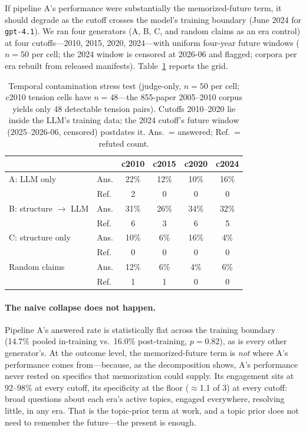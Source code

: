 If pipeline A's performance were substantially the memorized-future
term, it should degrade as the cutoff crosses the model's training
boundary (June 2024 for \texttt{gpt-4.1}). We ran four generators (A,
B, C, and random claims as an era control) at four cutoffs---2010,
2015, 2020, 2024---with uniform four-year future windows ($n=50$ per
cell; the 2024 window is censored at 2026-06 and flagged; corpora per
era rebuilt from released manifests). Table~\ref{tab:stress} reports
the grid.

\begin{table}[t]
  \centering
  \small
  \caption{Temporal contamination stress test (judge-only, $n=50$ per
  cell; c2010 tension cells have $n=48$---the 855-paper 2005--2010
  corpus yields only 48 detectable tension pairs). Cutoffs 2010--2020
  lie inside the LLM's training data; the 2024 cutoff's future window
  (2025--2026-06, censored) postdates it. Ans.\ = answered; Ref.\ =
  refuted count.}
  \label{tab:stress}
  \begin{tabular}{@{}llcccc@{}}
    \toprule
    & & c2010 & c2015 & c2020 & c2024 \\
    \midrule
    A: LLM only & Ans. & 22\% & 12\% & 10\% & 16\% \\
                & Ref. & 2 & 0 & 0 & 0 \\
    B: structure $\to$ LLM & Ans. & 31\% & 26\% & 34\% & 32\% \\
                & Ref. & 6 & 3 & 6 & 5 \\
    C: structure only & Ans. & 10\% & 6\% & 16\% & 4\% \\
                & Ref. & 0 & 0 & 0 & 0 \\
    Random claims & Ans. & 12\% & 6\% & 4\% & 6\% \\
                & Ref. & 1 & 1 & 0 & 0 \\
    \bottomrule
  \end{tabular}
\end{table}

\paragraph{The naive collapse does not happen.} Pipeline A's answered
rate is statistically flat across the training boundary (14.7\% pooled
in-training vs.\ 16.0\% post-training, $p=0.82$), as is every other
generator's. At the outcome level, the memorized-future term is
\emph{not} where A's performance comes from---because, as the
decomposition shows, A's performance never rested on specifics that
memorization could supply. Its engagement sits at 92--98\% at every
cutoff, its specificity at the floor ($\approx$1.1 of 3) at every
cutoff: broad questions about each era's active topics, engaged
everywhere, resolving little, in any era. That is the topic-prior term
at work, and a topic prior does not need to remember the future---the
present is enough.

